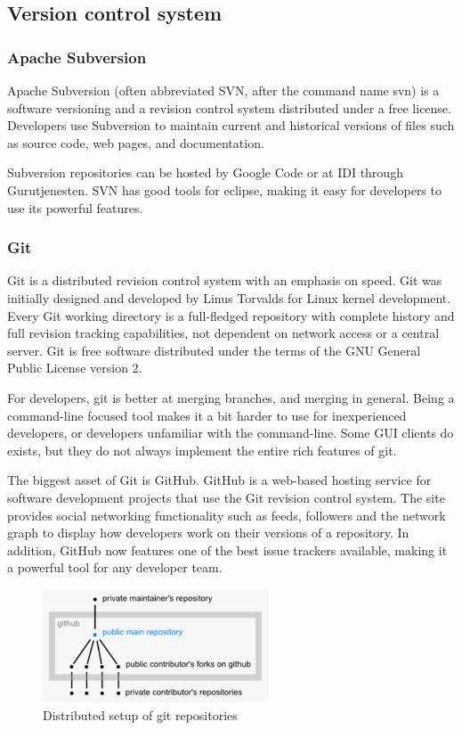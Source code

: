 \subsection{Version control system}

\subsubsection{Apache Subversion}
Apache Subversion (often abbreviated SVN, after the command name svn) is a software versioning and a revision control system distributed under a free license. Developers use Subversion to maintain current and historical versions of files such as source code, web pages, and documentation.\cite{wiki:svn}

Subversion repositories can be hosted by Google Code or at IDI through Gurutjenesten. SVN has good tools for eclipse, making it easy for developers to use its powerful features.

\subsubsection{Git}
Git is a distributed revision control system with an emphasis on speed. Git was initially designed and developed by Linus Torvalds for Linux kernel development. Every Git working directory is a full-fledged repository with complete history and full revision tracking capabilities, not dependent on network access or a central server. Git is free software distributed under the terms of the GNU General Public License version 2.\cite{wiki:git}

For developers, git is better at merging branches, and merging in general. Being a command-line focused tool makes it a bit harder to use for inexperienced developers, or developers unfamiliar with the command-line. Some GUI clients do exists, but they do not always implement the entire rich features of git. 

The biggest asset of Git is GitHub. GitHub is a web-based hosting service for software development projects that use the Git revision control system. The site provides social networking functionality such as feeds, followers and the network graph to display how developers work on their versions of a repository.\cite{wiki:github} In addition, GitHub now features one of the best issue trackers available, making it a powerful tool for any developer team.

\begin{figure}[htb]
	\centering
	\includegraphics[width=0.6\textwidth]{prestudy/github.jpg}
	\caption{Distributed setup of git repositories\cite{git:repositories}}
	\label{fig:github}
\end{figure}

